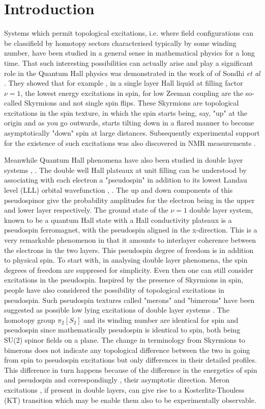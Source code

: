 \section{Introduction}
Systems which permit topological excitations, i.e. where field
configurations can be classifield by homotopy sectors
characterised typically by some winding number, have been
studied in a general sense in mathematical physics for a long
time. That such interesting possibilities can actually arise
and play a significant role in the Quantum Hall physics was
demonstrated in the work of of Sondhi {\it et al} \cite
{Sondhi}. They showed that for example , in a single layer Hall
liquid at filling factor $\nu = 1$, the lowest energy
excitations in spin, for low Zeeman coupling are the so-called
Skyrmions and not single spin flips. These Skyrmions are
topological excitations in the spin texture, in which the spin
starts being, say, "up" at the origin and as you go outwards,
starts tilting down in a flared manner to become asymptotically
"down" spin at large distances. Subsequently experimental
support for the existence of such excitations was also
discovered in NMR measurements \cite{Barrett}.

Meanwhile Quantum Hall phenomena have also been studied in
double layer systems \cite{Eisen}, \cite{Tapas}. The double well
Hall plateaux at unit filling can be understood by associating with
each electron a "pseudospin" in addition to its lowest Landau
level (LLL) orbital wavefunction \cite{GirvMac}, \cite{Moon}.
The up and down components of this pseudospinor give the
probability amplitudes for the electron being in the upper and
lower layer respectively. The ground state of the $\nu = 1 $
double layer system, known to be a quantum Hall state with a
Hall conductivity plateaux is a pseudospin ferromagnet, with the
pseudospin aligned in the x-direction. This is a very
remarkable phenomenon in that it amounts to interlayer coherence
between the electrons in the two layers. This pseudospin degree
of freedom is in addition to physical spin. To start with, in
analysing double layer phenomena, the spin degrees of freedom
are suppresed for simplicity. Even then one can still consider
excitations in the pseudospin. Inspired by the presence of
Skyrmions in spin, people have also considered the possibility
of topological excitations in pseudospin. Such pseudospin
textures called "merons" and "bimerons" have been suggested as
possible low lying excitations of double layer systems
\cite{GirvMac}. The homotopy group $\pi_{2}[S_{2}]$ and its
winding number are identical for spin and pseudospin since
mathematically pseudospin is identical to spin, both being SU(2)
spinor fields on a plane. The change in terminology from
Skyrmions to bimerons does not indicate any topological
difference between the two in going from spin to pseudospin
excitations but only differences in their detailed profiles.
This difference in turn happens because of the difference in the
energetics of spin and pseudospin and correspondingly , their
asymptotic direction. Meron excitations , if present in double
layers, can give rise to a Kosterlitz-Thouless (KT) \cite{KT}
transition which may be enable them also to be experimentally
observable.

